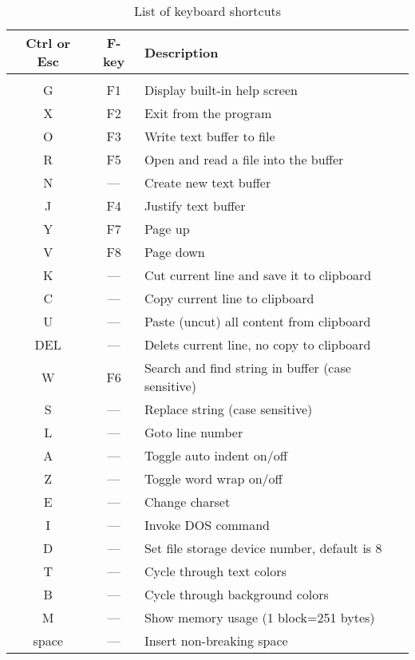 \documentclass{article}
\begin{document}
	\begin{longtable}{c c l}
		\caption{List of keyboard shortcuts} \\
	    \textbf{Ctrl or Esc} & \textbf{F-key} & \textbf{Description} \\
	    \hline \\
            G    & F1    & Display built-in help screen \\
            X    & F2    & Exit from the program \\
            O    & F3    & Write text buffer to file \\
            R    & F5    & Open and read a file into the buffer \\
            N    & ---   & Create new text buffer \\
            J    & F4    & Justify text buffer \\
            Y    & F7    & Page up \\
            V    & F8    & Page down \\
            K    & ---   & Cut current line and save it to clipboard \\
            C    & ---   & Copy current line to clipboard \\
            U    & ---   & Paste (uncut) all content from clipboard \\
            DEL  & ---   & Delets current line, no copy to clipboard \\
            W    & F6    & Search and find string in buffer (case sensitive) \\
            S    & ---   & Replace string (case sensitive) \\
            L    & ---   & Goto line number \\
            A    & ---   & Toggle auto indent on/off \\
            Z    & ---   & Toggle word wrap on/off \\
            E    & ---   & Change charset\\
            I    & ---   & Invoke DOS command\\
            D    & ---   & Set file storage device number, default is 8 \\
            T    &  ---  & Cycle through text colors \\
            B    &  ---  & Cycle through background colors \\
            M    &  ---  & Show memory usage (1 block=251 bytes) \\
            space& ---   & Insert non-breaking space 
        \end{longtable}
\end{document}
